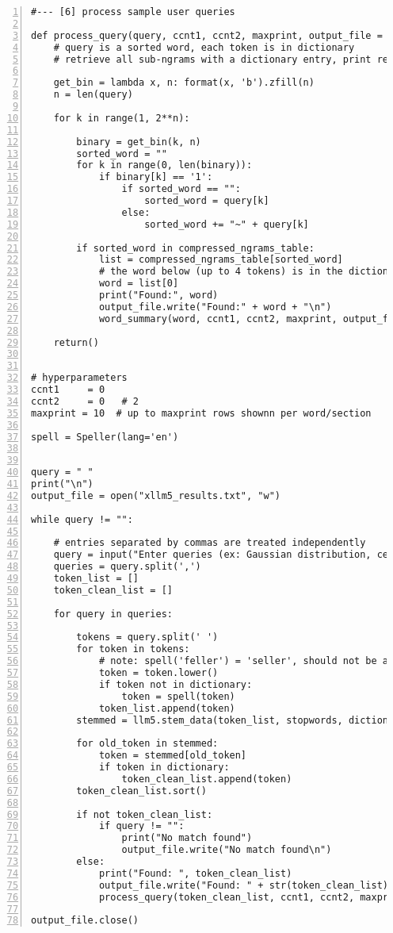 \documentclass[oneside,10pt]{book}
\begin{document}
\begin{lstlisting}[numbers=left]
#--- [6] process sample user queries

def process_query(query, ccnt1, ccnt2, maxprint, output_file = ""):
    # query is a sorted word, each token is in dictionary
    # retrieve all sub-ngrams with a dictionary entry, print results for each one

    get_bin = lambda x, n: format(x, 'b').zfill(n)
    n = len(query)

    for k in range(1, 2**n): 

        binary = get_bin(k, n)
        sorted_word = ""
        for k in range(0, len(binary)):
            if binary[k] == '1':
                if sorted_word == "":
                    sorted_word = query[k]
                else:
                    sorted_word += "~" + query[k]

        if sorted_word in compressed_ngrams_table:
            list = compressed_ngrams_table[sorted_word]
            # the word below (up to 4 tokens) is in the dictionary
            word = list[0]
            print("Found:", word)
            output_file.write("Found:" + word + "\n")
            word_summary(word, ccnt1, ccnt2, maxprint, output_file)
            
    return()
   

# hyperparameters 
ccnt1     = 0  
ccnt2     = 0   # 2  
maxprint = 10  # up to maxprint rows shownn per word/section

spell = Speller(lang='en') 


query = " "
print("\n")
output_file = open("xllm5_results.txt", "w")

while query != "":  

    # entries separated by commas are treated independently
    query = input("Enter queries (ex: Gaussian distribution, central moments): ") 
    queries = query.split(',')
    token_list = []
    token_clean_list = []

    for query in queries:

        tokens = query.split(' ')
        for token in tokens:
            # note: spell('feller') = 'seller', should not be autocorrected
            token = token.lower()
            if token not in dictionary:
                token = spell(token) 
            token_list.append(token)
        stemmed = llm5.stem_data(token_list, stopwords, dictionary, mode = 'Internal')   

        for old_token in stemmed:
            token = stemmed[old_token]
            if token in dictionary:
                token_clean_list.append(token)
        token_clean_list.sort()

        if not token_clean_list: 
            if query != "":
                print("No match found")
                output_file.write("No match found\n")
        else:
            print("Found: ", token_clean_list) 
            output_file.write("Found: " + str(token_clean_list) + "\n") 
            process_query(token_clean_list, ccnt1, ccnt2, maxprint, output_file)

output_file.close()

\end{lstlisting}
\end{document}
